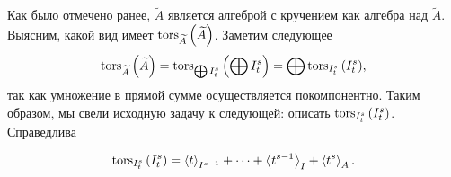     Как было отмечено ранее, $\widetilde{A}$ является алгеброй с кручением как алгебра над $\widetilde{A}$. 
    Выясним, какой вид имеет $\textup{tors}_{\widetilde{A}}\left(\widetilde{A}\right)$. Заметим следующее
    \begin{equation*}
        \textup{tors}_{\widetilde{A}}\left(\widetilde{A}\right) = \textup{tors}_{\bigoplus I^s_t}\left(\bigoplus I^s_t\right)  = \bigoplus{\textup{tors}_{I^s_t}\left(I^s_t\right)},
    \end{equation*}
    так как умножение в прямой сумме осуществляется покомпонентно. Таким образом, мы свели исходную
    задачу к следующей: описать $\textup{tors}_{I^s_t}\left(I^s_t\right)$. Справедлива
    \begin{Theorem}
        \begin{equation*}
            \textup{tors}_{I^s_t}\left(I^s_t\right) = 
            \left< t \right>_{I^{s-1}} + 
            \dots +
            \left< t^{s-1} \right>_{I} + 
            \left< t^s \right>_A.
        \end{equation*}
    \end{Theorem}
